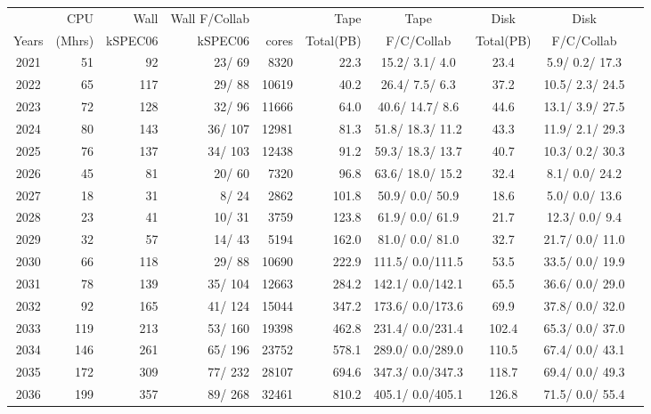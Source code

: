 \documentclass[12pt]{article}
\begin{document}
\begin{table}
\footnotesize
 \centering \begin{tabular}[h]{crrrrrcccc}
 & CPU &Wall&Wall F/Collab&\qquad  & Tape\qquad& Tape\qquad  & Disk\qquad  & Disk\qquad \\
Years&(Mhrs)&kSPEC06&kSPEC06&cores& Total(PB)&F/C/Collab & Total(PB) &F/C/Collab\\
\hline
2021&	  51&	  92&	  23/  69&	  8320&	     22.3&	  15.2/  3.1/  4.0&	     23.4&	   5.9/  0.2/ 17.3\\
2022&	  65&	 117&	  29/  88&	 10619&	     40.2&	  26.4/  7.5/  6.3&	     37.2&	  10.5/  2.3/ 24.5\\
2023&	  72&	 128&	  32/  96&	 11666&	     64.0&	  40.6/ 14.7/  8.6&	     44.6&	  13.1/  3.9/ 27.5\\
2024&	  80&	 143&	  36/ 107&	 12981&	     81.3&	  51.8/ 18.3/ 11.2&	     43.3&	  11.9/  2.1/ 29.3\\
2025&	  76&	 137&	  34/ 103&	 12438&	     91.2&	  59.3/ 18.3/ 13.7&	     40.7&	  10.3/  0.2/ 30.3\\
2026&	  45&	  81&	  20/  60&	  7320&	     96.8&	  63.6/ 18.0/ 15.2&	     32.4&	   8.1/  0.0/ 24.2\\
2027&	  18&	  31&	   8/  24&	  2862&	    101.8&	  50.9/  0.0/ 50.9&	     18.6&	   5.0/  0.0/ 13.6\\
2028&	  23&	  41&	  10/  31&	  3759&	    123.8&	  61.9/  0.0/ 61.9&	     21.7&	  12.3/  0.0/  9.4\\
2029&	  32&	  57&	  14/  43&	  5194&	    162.0&	  81.0/  0.0/ 81.0&	     32.7&	  21.7/  0.0/ 11.0\\
2030&	  66&	 118&	  29/  88&	 10690&	    222.9&	 111.5/  0.0/111.5&	     53.5&	  33.5/  0.0/ 19.9\\
2031&	  78&	 139&	  35/ 104&	 12663&	    284.2&	 142.1/  0.0/142.1&	     65.5&	  36.6/  0.0/ 29.0\\
2032&	  92&	 165&	  41/ 124&	 15044&	    347.2&	 173.6/  0.0/173.6&	     69.9&	  37.8/  0.0/ 32.0\\
2033&	 119&	 213&	  53/ 160&	 19398&	    462.8&	 231.4/  0.0/231.4&	    102.4&	  65.3/  0.0/ 37.0\\
2034&	 146&	 261&	  65/ 196&	 23752&	    578.1&	 289.0/  0.0/289.0&	    110.5&	  67.4/  0.0/ 43.1\\
2035&	 172&	 309&	  77/ 232&	 28107&	    694.6&	 347.3/  0.0/347.3&	    118.7&	  69.4/  0.0/ 49.3\\
2036&	 199&	 357&	  89/ 268&	 32461&	    810.2&	 405.1/  0.0/405.1&	    126.8&	  71.5/  0.0/ 55.4\\

\end{tabular}
\end{table}
\end{document}
